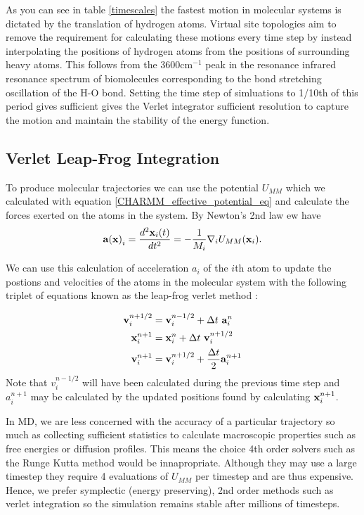 As you can see in table \ref{timescales} the fastest motion in molecular systems is dictated by the translation of hydrogen atoms. Virtual site topologies aim to remove the requirement for calculating these motions every time step by instead interpolating the positions of hydrogen atoms from the positions of surrounding heavy atoms. This follows from the 3600cm$^{-1}$ peak in the resonance infrared resonance spectrum of biomolecules corresponding to the bond stretching oscillation of the H-O bond. \cite{schlick2010} Setting the time step of simluations to 1/10th of this period gives sufficient gives the Verlet integrator sufficient resolution to capture the motion and maintain the stability of the energy function.

\subsection{ Verlet Leap-Frog Integration}
To produce molecular trajectories we can use the potential $U_{MM}$ which we calculated with equation \ref{CHARMM_effective_potential_eq} and calculate the forces exerted on the atoms in the system.  By Newton's 2nd law ew have 
\begin{equation}
	\bold{a(\bold{x})}_i = \frac{d^2 \bold{x}_i(t)}{dt^2} = - \frac{1}{M_i} \nabla_i U_{MM}(\bold{x}_i).
\end{equation}
 
We can use this calculation of acceleration $a_i$ of the $i$th atom to update the postions and velocities of the atoms in the molecular system with the following triplet of equations known as the leap-frog verlet method \cite{schlick2010}:

\begin{equation} \label {leap-frog_equation}
	\begin{aligned}
		\bold{v}_i^{n+1/2} &= \bold{v}_i^{n-1/2} + \Delta t\  \bold{a}_i^n \\
		\bold{x}^{n+1}_i &= \bold{x}_i^{n} + \Delta t\  \bold{v}_i^{n+1/2}  \\
		\bold{v}^{n+1}_i &= \bold{v}_i^{n+1/2} + \frac{\Delta t} {2} \bold{a}_i^{n+1} \\
	\end{aligned}
 \end{equation}
 Note that $v_i^{n-1/2}$ will have  been calculated during the previous time step and $a_i^{n+1}$ may be  calculated by the updated positions found by calculating  $\bold{x}^{n+1}_i$.

 In MD, we are less concerned with the accuracy of a particular trajectory so much as collecting sufficient statistics to calculate macroscopic properties such as free energies or diffusion profiles. This means the choice 4th order solvers such as the Runge Kutta method would be innapropriate. Although they may use a large timestep they require 4 evaluations of $U_{MM}$ per timestep and are thus expensive. Hence, we prefer symplectic (energy preserving), 2nd order methods such as verlet integration so the simulation remains stable after millions of timesteps\cite{streett1978}. 


